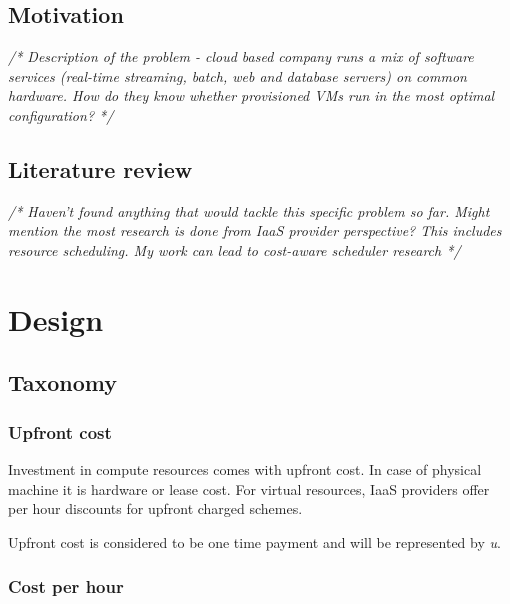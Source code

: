\documentclass[]{final_report}
\begin{document}
\section{Motivation}
\emph{ /* Description of the problem - cloud based company runs a mix of software services (real-time streaming, batch, web and database servers) on common hardware. How do they know whether provisioned VMs run in the most optimal configuration? */ }

\section{Literature review}
\emph{/* Haven't found anything that would tackle this specific problem so far. Might mention the most research is done from IaaS provider perspective? This includes resource scheduling. My work can lead to cost-aware scheduler research */}




\chapter{Design}

\section{Taxonomy}

\subsection{Upfront cost}

Investment in compute resources comes with upfront cost. In case of physical machine it is hardware or lease cost. For virtual resources, IaaS providers offer per hour discounts for upfront charged schemes. \par
Upfront cost is considered to be one time payment and will be represented by \textit{u}. 

\subsection{Cost per hour}
\end{document}
